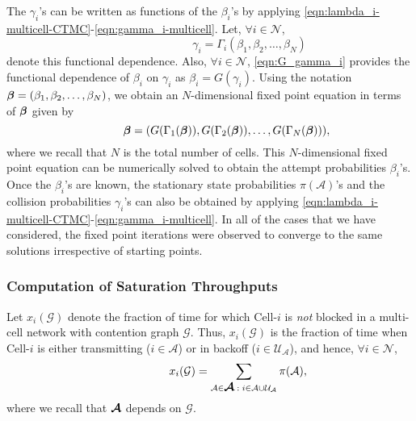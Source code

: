 \documentclass[10pt,a4paper,journal]{IEEEtran}
\theoremstyle{definition}
\theoremstyle{remark}
\theoremstyle{plain}
\newcommand{\bmath}[1]{\mbox{\boldmath$#1$}}
\begin{document}
The $\gamma_i$'s can be written as functions of the $\beta_i$'s by applying \eqref{eqn:lambda_i-multicell-CTMC}-\eqref{eqn:gamma_i-multicell}. Let, $\forall i \in \mathcal{N}$, 
\[\quad \quad \quad \quad \quad \quad \quad \gamma_i = \Gamma_i(\beta_1, \beta_2, \ldots, \beta_N)\] 
denote this functional dependence. Also, $\forall i \in \mathcal{N}$, \eqref{eqn:G_gamma_i} provides the functional dependence of $\beta_i$ on $\gamma_i$ as $\beta_i = G(\gamma_i)$. Using the notation $\bmath{\beta} = (\beta_1, \beta_2, \ldots, \beta_N)$, we obtain an $N$-dimensional fixed point equation in terms of $\bmath{\beta}$ given by 
\begin{equation}
\label{eqn:N-dim-multi-cell-fixed-point}
\quad \quad \quad \bmath{\beta} = (G(\Gamma_1(\bmath{\beta})), G(\Gamma_2(\bmath{\beta})), \ldots, G(\Gamma_N(\bmath{\beta}))),
\end{equation} 
where we recall that $N$ is the total number of cells. This $N$-dimensional fixed point equation can be numerically solved to obtain the attempt probabilities $\beta_i$'s. Once the $\beta_i$'s are known, the stationary state probabilities $\pi(\mathcal{A})$'s and the collision probabilities $\gamma_i$'s can also be obtained by applying \eqref{eqn:lambda_i-multicell-CTMC}-\eqref{eqn:gamma_i-multicell}. In all of the cases that we have considered, the fixed point iterations were observed to converge to the same solutions irrespective of starting points.



\subsubsection{Computation of Saturation Throughputs}
\label{subsubsec:computing-cell-throughputs}

Let $x_i(\mathcal{G})$ denote the fraction of time for which Cell-$i$ is \textit{not} blocked in a multi-cell network with contention graph $\mathcal{G}$. Thus, $x_i(\mathcal{G})$ is the fraction of time when Cell-$i$ is either transmitting ($i \in \mathcal{A}$) or in backoff ($i \in \mathcal{U}_{\mathcal{A}}$), and hence, $\forall i \in \mathcal{N}$, 
\begin{equation}
\label{eqn:fraction-of-channel-time}
\quad \quad \quad \quad \quad x_i(\mathcal{G}) = \sum_{\mathcal{A} \in \bmath{\mathcal{A}}\; : \; i \in \mathcal{A} \cup \mathcal{U}_{\mathcal{A}}} \pi(\mathcal{A}), 
\end{equation}
where we recall that $\bmath{\mathcal{A}}$ depends on $\mathcal{G}$. 
\end{document}
